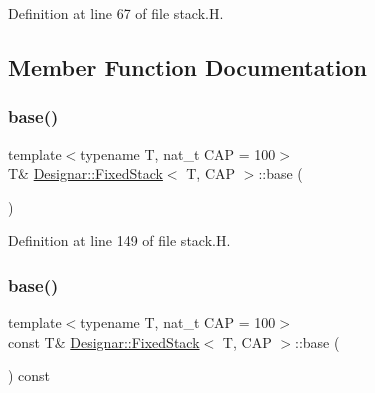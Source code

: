Definition at line 67 of file stack.\+H.



\subsection{Member Function Documentation}
\mbox{\label{class_designar_1_1_fixed_stack_a01f5207d31f8bbad380ea6923a0bbb80}} 
\subsubsection{\texorpdfstring{base()}{base()}\hspace{0.1cm}{\footnotesize\ttfamily [1/2]}}
{\footnotesize\ttfamily template$<$typename T, nat\+\_\+t C\+AP = 100$>$ \\
T\& \hyperlink{class_designar_1_1_fixed_stack}{Designar\+::\+Fixed\+Stack}$<$ T, C\+AP $>$\+::base (\begin{DoxyParamCaption}{ }\end{DoxyParamCaption})\hspace{0.3cm}{\ttfamily [inline]}}



Definition at line 149 of file stack.\+H.

\mbox{\label{class_designar_1_1_fixed_stack_a27e6b0668b52af53a224a0e8fcd4b719}} 
\subsubsection{\texorpdfstring{base()}{base()}\hspace{0.1cm}{\footnotesize\ttfamily [2/2]}}
{\footnotesize\ttfamily template$<$typename T, nat\+\_\+t C\+AP = 100$>$ \\
const T\& \hyperlink{class_designar_1_1_fixed_stack}{Designar\+::\+Fixed\+Stack}$<$ T, C\+AP $>$\+::base (\begin{DoxyParamCaption}{ }\end{DoxyParamCaption}) const\hspace{0.3cm}{\ttfamily [inline]}}



